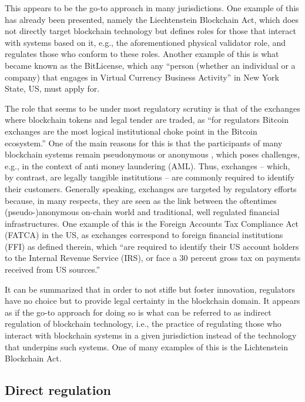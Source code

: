 This appears to be the go-to approach in many jurisdictions.
One example of this has already been presented, namely the Liechtenstein Blockchain Act, which does not directly target blockchain technology but defines roles for those that interact with systems based on it, e.g., the aforementioned physical validator role, and regulates those who conform to these roles.
Another example of this is what became known as the BitLicense, which any ``person (whether an individual or a company) that engages in Virtual Currency Business Activity'' in New York State, US, must apply for. \autocite{ny2021bitlicense}

The role that seems to be under most regulatory scrutiny is that of the exchanges where blockchain tokens and legal tender are traded, as ``for regulators Bitcoin exchanges are the most logical institutional choke point in the Bitcoin ecosystem.'' \autocite[1153]{tsukerman2015}
One of the main reasons for this is that the participants of many blockchain systems remain pseudonymous \autocite[6]{zhang2019} or anonymous \autocite{github2013cryptonote}, which poses challenges, e.g., in the context of anti money laundering (AML).
Thus, exchanges -- which, by contrast, are legally tangible institutions -- are commonly required to identify their customers.
Generally speaking, exchanges are targeted by regulatory efforts because, in many respects, they are seen as the link between the oftentimes \mbox{(pseudo-)}anonymous on-chain world and traditional, well regulated financial infrastructures.
One example of this is the Foreign Accounts Tax Compliance Act (FATCA) in the US, as exchanges correspond to foreign financial institutions (FFI) as defined therein, which ``are required to identify their US account holders to the Internal Revenue Service (IRS), or face a 30 percent gross tax on payments received from US sources.'' \autocite[1151]{tsukerman2015} 

It can be summarized that in order to not stifle but foster innovation, regulators have no choice but to provide legal certainty in the blockchain domain.
It appears as if the go-to approach for doing so is what can be referred to as indirect regulation of blockchain technology, i.e., the practice of regulating those who interact with blockchain  systems in a given jurisdiction instead of the technology that underpins such systems.
One of many examples of this is the Lichtenstein Blockchain Act.

\subsection{Direct regulation}

